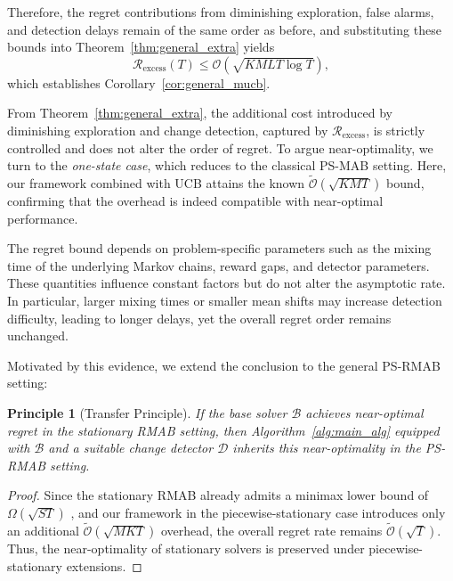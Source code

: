 \documentclass[twoside]{article}
\theoremstyle{plain}
\newtheorem{principle}[theorem]{Principle}
\theoremstyle{definition}
\theoremstyle{remark}
\def\Rex{\mathcal{R}_{\mathrm{excess}}}
\begin{document}
Therefore, the regret contributions from diminishing exploration, false alarms, and detection delays remain of the same order as before, and substituting these bounds into Theorem~\ref{thm:general_extra} yields
\begin{equation}
\Rex(T) \le \mathcal{O}\!\left(\sqrt{KMLT \log T}\right),
\end{equation}
which establishes Corollary~\ref{cor:general_mucb}.



From Theorem~\ref{thm:general_extra}, the additional cost introduced by 
diminishing exploration and change detection, captured by $\Rex$, 
is strictly controlled and does not alter the order of regret. 
To argue near-optimality, we turn to the \emph{one-state case}, 
which reduces to the classical PS-MAB setting. 
Here, our framework combined with UCB attains the known 
$\tilde {\mathcal{O}}(\sqrt{KMT})$ bound, confirming that the overhead is indeed 
compatible with near-optimal performance.

The regret bound depends on problem-specific parameters such as the mixing time of the underlying Markov chains, reward gaps, and detector parameters. These quantities influence constant factors but do not alter the asymptotic rate. In particular, larger mixing times or smaller mean shifts may increase detection difficulty, leading to longer delays, yet the overall regret order remains unchanged.

Motivated by this evidence, we extend the conclusion to the general PS-RMAB setting:

\begin{principle}[Transfer Principle]\label{princ:transfer}
If the base solver $\mathcal{B}$ achieves near-optimal regret in the 
stationary RMAB setting, then Algorithm~\ref{alg:main_alg} equipped with 
$\mathcal{B}$ and a suitable change detector $\mathcal{D}$ 
inherits this near-optimality in the PS-RMAB setting.
\end{principle}
\vspace{-10pt}
\begin{proof}
Since the stationary RMAB already admits a minimax lower bound of 
$\Omega(\sqrt{ST})$ \citep{ortner2012regret}, and our framework in the 
piecewise-stationary case introduces only an additional 
$\tilde{\mathcal O}(\sqrt{MKT})$ overhead, the overall regret rate 
remains $\tilde{\mathcal O}(\sqrt{T})$. 
Thus, the near-optimality of stationary solvers is preserved under 
piecewise-stationary extensions.
\end{proof}
% 
% 
\vspace{-15pt}
\end{document}
